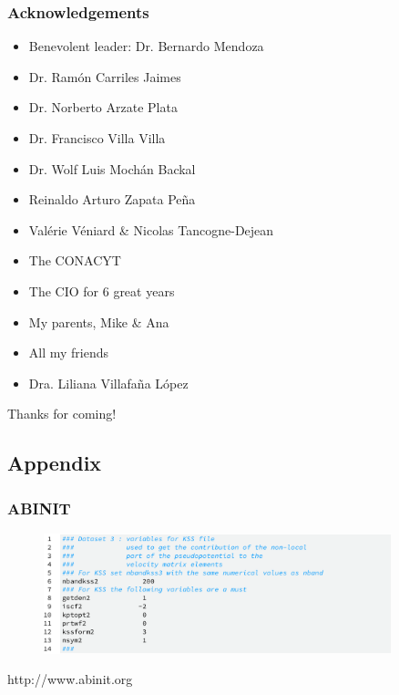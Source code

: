 \documentclass{beamer}
\begin{document}
\begin{frame}
\frametitle{Acknowledgements}
\begin{itemize}
\item Benevolent leader: Dr. Bernardo Mendoza
\item Dr. Ram\'on Carriles Jaimes
\item Dr. Norberto Arzate Plata
\item Dr. Francisco Villa Villa
\item Dr. Wolf Luis Moch\'an Backal
\item Reinaldo Arturo Zapata Pe\~na
\item Val\'erie V\'eniard \& Nicolas Tancogne-Dejean
\item The CONACYT
\item The CIO for 6 great years
\item My parents, Mike \& Ana
\item All my friends
\item Dra. Liliana Villafa\~na L\'opez
\end{itemize}
\begin{center}
{\huge Thanks for coming!}
\end{center}
\end{frame}


\subsection{Appendix}

\begin{frame}
\hypertarget{app-abinit}{}
\frametitle{ABINIT}
\centering
\begin{figure}
\includegraphics[width=0.9\textwidth]{code-abinit}
\end{figure}
http://www.abinit.org
\end{frame}
\end{document}
